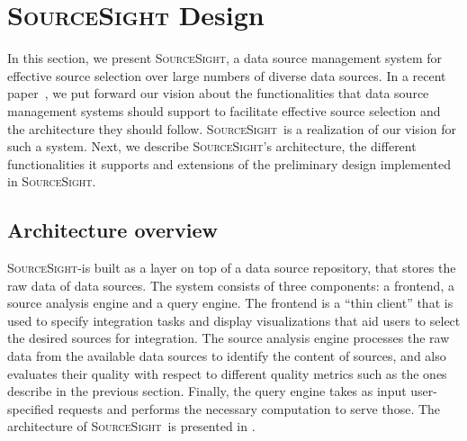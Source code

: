 \documentclass{vldb}
\newcommand\system{\textsc{SourceSight}}
\begin{document}
%
%
%
%
%
%
%
%
%
%

\section{{\Large \system} Design}
\label{sec:design}
In this section, we present \system, a data source management system for effective source selection over large numbers of diverse data sources. In a recent paper~\cite{rekatsinas:2015}, we put forward our vision about the functionalities that data source management systems should support to facilitate effective source selection and the architecture they should follow. 
\system~is a realization of our vision for such a system. Next, we describe \system's architecture, the different functionalities it supports and extensions of the preliminary design implemented in \system.%

\subsection{Architecture overview}
\system-is built as a layer on top of a data source repository, that stores the raw data of data sources. The system consists of three components: a frontend, a source analysis engine and a query engine. The frontend is a ``thin client'' that is used to specify integration tasks and display visualizations that aid users to select the desired sources for integration. The source analysis engine processes the raw data from the available data sources to identify the content of sources, and also evaluates their quality with respect to different quality metrics such as the ones describe in the previous section. Finally, the query engine takes as input user-specified requests and performs the necessary computation to serve those. The architecture of \system~is presented in . 
\end{document}
